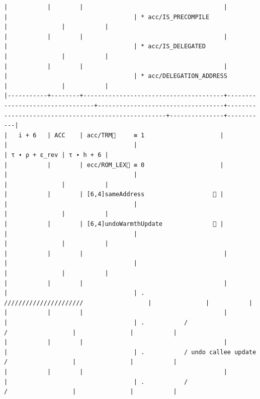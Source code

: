 \documentclass[varwidth=\maxdimen,margin=0.5cm,multi={verbatim}]{standalone}
\begin{document}
\begin{verbatim}
|           |        |                                       |                                 |                                   | * acc/IS_PRECOMPILE                                 |               |           |
|           |        |                                       |                                 |                                   | * acc/IS_DELEGATED                                  |               |           |
|           |        |                                       |                                 |                                   | * acc/DELEGATION_ADDRESS                            |               |           |
|-----------+--------+---------------------------------------+---------------------------------+-----------------------------------+-----------------------------------------------------+---------------+-----------|
|   i + 6   | ACC    | acc/TRM🚩     ≡ 1                     |                                 |                                   |                                                     | τ ∙ ρ + ε_rev | τ ∙ h + 6 |
|           |        | ecc/ROM_LEX🚩 ≡ 0                     |                                 |                                   |                                                     |               |           |
|           |        | [6,4]sameAddress                   👋 |                                 |                                   |                                                     |               |           |
|           |        | [6,4]undoWarmthUpdate              👋 |                                 |                                   |                                                     |               |           |
|           |        |                                       |                                 |                                   |                                                     |               |           |
|           |        |                                       |                                 |                                   | .           //////////////////////                  |               |           |
|           |        |                                       |                                 |                                   | .           /                    /                  |               |           |
|           |        |                                       |                                 |                                   | .           / undo callee update /                  |               |           |
|           |        |                                       |                                 |                                   | .           /                    /                  |               |           |

\end{verbatim}
\end{document}
